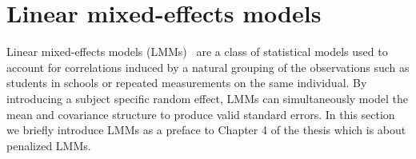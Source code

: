 \begin{comment}

To our knowledge, strong hierarchies have never previously been used in HD interaction analysis in genomics or brain imaging studies. Furthermore, the specific choices of weights proposed here, i.e., based on the transformed variables from phase 2, have not been previously used. Choi \textit{et al.}~\citep{choi2010variable} estimated their weights simultaneously, but this would not be feasible in HD data. Finally, the adaptation to interactions with one key $E$ variable is specific to our situation and this leads to computational efficiencies. These three points constitute novel aspects of this thesis. I have a working implementation of this, and am in the process of conducting simulation studies.
\end{comment}


\section{Linear mixed-effects models}

Linear mixed-effects models (LMMs)~\citep{laird1982random} are a class of statistical models used to account for correlations induced by a natural grouping of the observations such as students in schools or repeated measurements on the same individual. By introducing a subject specific random effect, LMMs can simultaneously model the mean and covariance structure to produce valid standard errors. In this section we briefly introduce LMMs as a preface to Chapter 4 of the thesis which is about penalized LMMs.

